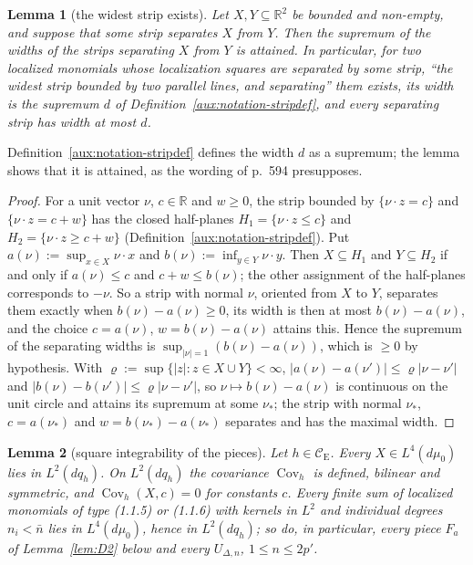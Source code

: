 \documentclass[11pt,a4paper]{article}
\theoremstyle{plain}
\theoremstyle{definition}
\theoremstyle{plain}
\newtheorem{auxlemma}{Lemma}
\theoremstyle{definition}
\newcommand{\R}{\mathbb{R}}
\newcommand{\CE}{\mathcal{C}_{\mathrm E}}
\DeclareMathOperator{\Cov}{Cov}
\newcommand{\dmu}{d\mu_0}
\begin{document}
\begin{auxlemma}[the widest strip exists]\label{aux:d2-widest}
Let $X,Y\subseteq\R^2$ be bounded and non-empty, and suppose that some strip separates $X$
from $Y$.  Then the supremum of the widths of the strips separating $X$ from $Y$ is attained.
In particular, for two localized monomials whose localization squares are separated by some
strip, ``the widest strip bounded by two parallel lines, and separating'' them
\cite[p.~594]{GJS} exists, its width is the supremum $d$ of
Definition~\ref{aux:notation-stripdef}, and every separating strip has width at most $d$.
\end{auxlemma}

Definition~\ref{aux:notation-stripdef} defines the width $d$ as a supremum; the lemma shows that
it is attained, as the wording of p.~594 presupposes.

\begin{proof}
For a unit vector $\nu$, $c\in\R$ and $w\ge0$, the strip bounded by $\{\nu\cdot z=c\}$ and
$\{\nu\cdot z=c+w\}$ has the closed half-planes $H_1=\{\nu\cdot z\le c\}$ and
$H_2=\{\nu\cdot z\ge c+w\}$ (Definition~\ref{aux:notation-stripdef}).  Put
$a(\nu):=\sup_{x\in X}\nu\cdot x$ and $b(\nu):=\inf_{y\in Y}\nu\cdot y$.  Then $X\subseteq H_1$
and $Y\subseteq H_2$ if and only if $a(\nu)\le c$ and $c+w\le b(\nu)$; the other assignment of
the half-planes corresponds to $-\nu$.  So a strip with normal $\nu$, oriented from $X$ to
$Y$, separates them exactly when $b(\nu)-a(\nu)\ge0$, its width is then at most
$b(\nu)-a(\nu)$, and the choice $c=a(\nu)$, $w=b(\nu)-a(\nu)$ attains this.  Hence the
supremum of the separating widths is $\sup_{|\nu|=1}(b(\nu)-a(\nu))$, which is $\ge0$ by
hypothesis.  With $\varrho:=\sup\{|z|:z\in X\cup Y\}<\infty$,
$|a(\nu)-a(\nu')|\le\varrho|\nu-\nu'|$ and $|b(\nu)-b(\nu')|\le\varrho|\nu-\nu'|$, so
$\nu\mapsto b(\nu)-a(\nu)$ is continuous on the unit circle and attains its supremum at some
$\nu_*$; the strip with normal $\nu_*$, $c=a(\nu_*)$ and $w=b(\nu_*)-a(\nu_*)$ separates and has
the maximal width.
\end{proof}

\begin{auxlemma}[square integrability of the pieces]\label{aux:d2-int}
Let $h\in\CE$.  Every $X\in L^4(\dmu)$ lies in $L^2(dq_h)$.  On $L^2(dq_h)$ the covariance
$\Cov_h$ is defined, bilinear and symmetric, and $\Cov_h(X,c)=0$ for constants $c$.  Every finite
sum of localized monomials of type (1.1.5) or (1.1.6) with kernels in $L^2$ and individual degrees
$n_i<\bar n$ lies in $L^4(\dmu)$, hence in $L^2(dq_h)$; so do, in particular, every piece $F_a$
of Lemma~\ref{lem:D2} below and every $U_{\Delta,n}$, $1\le n\le2p'$.
\end{auxlemma}
\end{document}
